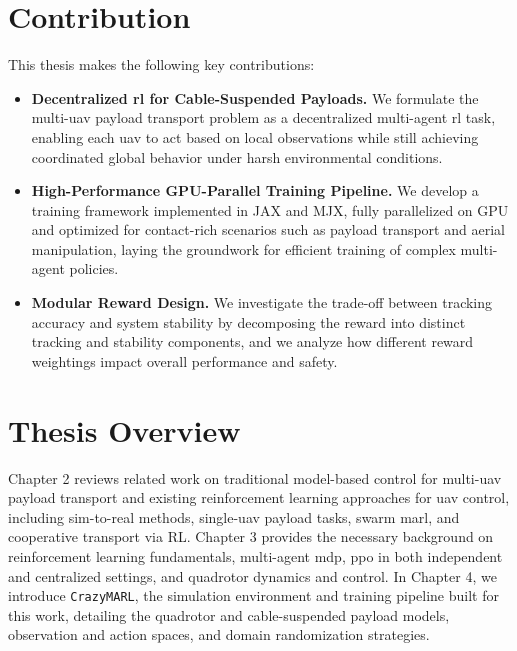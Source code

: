 \section{Contribution}
This thesis makes the following key contributions:
\begin{itemize}
    \item \textbf{Decentralized \gls{rl} for Cable-Suspended Payloads.} We formulate the multi-\gls{uav} payload transport problem as a decentralized multi-agent \gls{rl} task, enabling each \gls{uav} to act based on local observations while still achieving coordinated global behavior under harsh environmental conditions.
    \item \textbf{High-Performance GPU-Parallel Training Pipeline.} We develop a training framework implemented in JAX and MJX, fully parallelized on GPU and optimized for contact-rich scenarios such as payload transport and aerial manipulation, laying the groundwork for efficient training of complex multi-agent policies.
    \item \textbf{Modular Reward Design.} We investigate the trade-off between tracking accuracy and system stability by decomposing the reward into distinct tracking and stability components, and we analyze how different reward weightings impact overall performance and safety.
\end{itemize}

\section{Thesis Overview}
Chapter 2 reviews related work on traditional model-based control for multi-\gls{uav} payload transport and existing reinforcement learning approaches for \gls{uav} control, including sim-to-real methods, single-\gls{uav} payload tasks, swarm \gls{marl}, and cooperative transport via RL. Chapter 3 provides the necessary background on reinforcement learning fundamentals, multi-agent \gls{mdp}, \gls{ppo} in both independent and centralized settings, and quadrotor dynamics and control. In Chapter 4, we introduce \texttt{CrazyMARL}, the simulation environment and training pipeline built for this work, detailing the quadrotor and cable-suspended payload models, observation and action spaces, and domain randomization strategies.